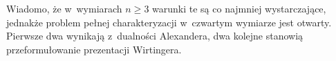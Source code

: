 Wiadomo, że w~wymiarach $n \ge 3$ warunki te są co najmniej wystarczające,
jednakże problem  pełnej charakteryzacji w~czwartym wymiarze jest otwarty.
Pierwsze dwa wynikają z~dualności Alexandera,
dwa kolejne stanowią przeformułowanie prezentacji Wirtingera.

